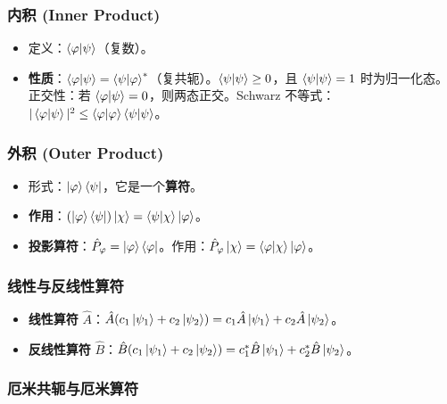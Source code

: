 \documentclass[12pt,a4paper]{article}
\begin{document}
\subsubsection{内积 (Inner Product)}

\begin{itemize}
    \item 定义：$\braket{\varphi|\psi}$（复数）。
    \item \textbf{性质}：$\braket{\varphi|\psi}=\braket{\psi|\varphi}^*$（复共轭）。$\braket{\psi|\psi}\ge 0$，且 $\braket{\psi|\psi}=1$ 时为归一化态。正交性：若 $\braket{\varphi|\psi}=0$，则两态正交。Schwarz 不等式：$|\braket{\varphi|\psi}|^2\le\braket{\varphi|\varphi}\braket{\psi|\psi}$。
\end{itemize}

\subsubsection{外积 (Outer Product)}

\begin{itemize}
    \item 形式：$\ket{\varphi}\bra{\psi}$，它是一个\textbf{算符}。
    \item \textbf{作用}：$(\ket{\varphi}\bra{\psi})\ket{\chi}=\braket{\psi|\chi}\ket{\varphi}$。
    \item \textbf{投影算符}：$\hat{P}_\varphi=\ket{\varphi}\bra{\varphi}$。作用：$\hat{P}_\varphi\ket{\chi}=\braket{\varphi|\chi}\ket{\varphi}$。
\end{itemize}

\subsubsection{线性与反线性算符}

\begin{itemize}
    \item \textbf{线性算符} $\hat{A}$：$\hat{A}(c_1\ket{\psi_1}+c_2\ket{\psi_2})=c_1\hat{A}\ket{\psi_1}+c_2\hat{A}\ket{\psi_2}$。
    \item \textbf{反线性算符} $\hat{B}$：$\hat{B}(c_1\ket{\psi_1}+c_2\ket{\psi_2})=c_1^*\hat{B}\ket{\psi_1}+c_2^*\hat{B}\ket{\psi_2}$。
\end{itemize}

\subsubsection{厄米共轭与厄米算符}
\end{document}
